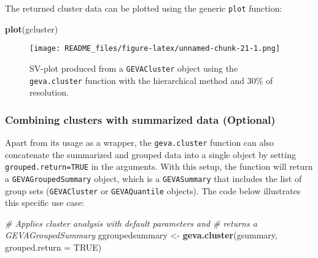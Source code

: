 \documentclass[
  12pt,
]{article}
\newenvironment{Shaded}{\begin{snugshade}}{\end{snugshade}}
\newcommand{\CommentTok}[1]{\textcolor[rgb]{0.56,0.35,0.01}{\textit{#1}}}
\newcommand{\DataTypeTok}[1]{\textcolor[rgb]{0.13,0.29,0.53}{#1}}
\newcommand{\FloatTok}[1]{\textcolor[rgb]{0.00,0.00,0.81}{#1}}
\newcommand{\KeywordTok}[1]{\textcolor[rgb]{0.13,0.29,0.53}{\textbf{#1}}}
\newcommand{\NormalTok}[1]{#1}
\newcommand{\OtherTok}[1]{\textcolor[rgb]{0.56,0.35,0.01}{#1}}
\newcommand{\StringTok}[1]{\textcolor[rgb]{0.31,0.60,0.02}{#1}}
\begin{document}
\begin{Shaded}
\end{Shaded}

The returned cluster data can be plotted using the generic \texttt{plot}
function:

\begin{Shaded}
\begin{Highlighting}[]
\KeywordTok{plot}\NormalTok{(gcluster)}
\end{Highlighting}
\end{Shaded}

\begin{figure}
\centering
\texttt{[image: README\_files/figure-latex/unnamed-chunk-21-1.png]}
\caption{SV-plot produced from a \texttt{GEVACluster} object using the
\texttt{geva.cluster} function with the hierarchical method and 30\% of
resolution.}
\end{figure}

\hypertarget{combining-clusters-with-summarized-data-optional}{%
\subsubsection{Combining clusters with summarized data
(Optional)}\label{combining-clusters-with-summarized-data-optional}}

Apart from its usage as a wrapper, the \texttt{geva.cluster} function
can also concatenate the summarized and grouped data into a single
object by setting \texttt{grouped.return=TRUE} in the arguments. With
this setup, the function will return a \texttt{GEVAGroupedSummary}
object, which is a \texttt{GEVASummary} that includes the list of group
sets (\texttt{GEVACluster} or \texttt{GEVAQuantile} objects). The code
below illustrates this specific use case:

\begin{Shaded}
\begin{Highlighting}[]
\CommentTok{# Applies cluster analysis with default parameters and}
\CommentTok{# returns a GEVAGroupedSummary}
\NormalTok{ggroupedsummary <-}\StringTok{ }\KeywordTok{geva.cluster}\NormalTok{(gsummary,}
                                \DataTypeTok{grouped.return =} \OtherTok{TRUE}\NormalTok{)}
\end{Highlighting}
\end{Shaded}
\end{document}
